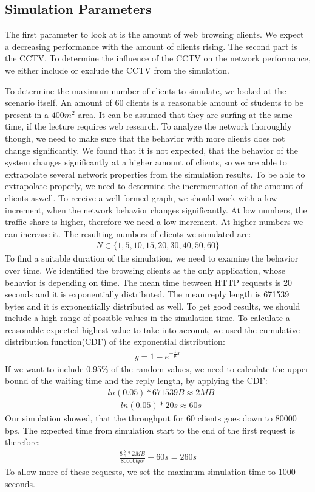 \documentclass[
10pt, %
a4paper, %
oneside, %
headinclude,footinclude, %
BCOR5mm, %
]{scrartcl}
\begin{document}
\subsection{Simulation Parameters}
The first parameter to look at is the amount of web browsing clients. We expect a decreasing performance with the amount of clients rising.
The second part is the CCTV. To determine the influence of the CCTV on the network performance, we either include or exclude the CCTV from the simulation.

To determine the maximum number of clients to simulate, we looked at the scenario itself. An amount of 60 clients is a reasonable amount of students to be present in a $400m^{2}$ area. It can be assumed that they are surfing at the same time, if the lecture requires web research. To analyze the network thoroughly though, we need to make sure that the behavior with more clients does not change significantly. We found that it is not expected, that the behavior of the system changes significantly at a higher amount of clients, so we are able to extrapolate several network properties from the simulation results.
To be able to extrapolate properly, we need to determine the incrementation of the amount of clients aswell. To receive a well formed graph, we should work with a low increment, when the network behavior changes significantly. At low numbers, the traffic share is higher, therefore we need a low increment. At higher numbers we can increase it. The resulting numbers of clients we simulated are:
\begin{align*}
N \in \{1,5,10,15,20,30,40,50,60\}
\end{align*}
To find a suitable duration of the simulation, we need to examine the behavior over time. We identified the browsing clients as the only application, whose behavior is depending on time. The mean time between HTTP requests is 20 seconds and it is exponentially distributed. The mean reply length is 671539 bytes and it is exponentially distributed as well. To get good results, we should include a high range of possible values in the simulation time. To calculate a reasonable expected highest value to take into account, we used the cumulative distribution function(CDF) of the exponential distribution:
\begin{align*}
y = 1-e^{-{\frac{1}{\mu}x}}
\end{align*}
If we want to include 0.95\% of the random values, we need to calculate the upper bound of the waiting time and the reply length, by applying the CDF:
\begin{align*}
{-ln(0.05)} * 671539 B \approx 2MB
\end{align*}
\begin{align*}
{-ln(0.05)} * 20s \approx 60s
\end{align*}
Our simulation showed, that the throughput for 60 clients goes down to 80000 bps. The expected time from simulation start to the end of the first request is therefore:
\begin{align*}
\frac{8\frac{b}{B} * 2MB}{80000 bps} + 60s = 260s
\end{align*}
To allow more of these requests, we set the maximum simulation time to 1000 seconds.
\end{document}
